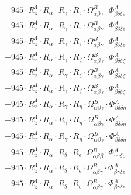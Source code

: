 \documentclass{article}
\begin{document}
\begin{subequations}
\begin{gather}
\begin{array}{c}
 \\[0.2em] 		 - 945 \cdot R_{z}^{4} \cdot R_{\alpha{}} \cdot R_{\gamma{}} \cdot R_{\epsilon{}} \cdot \Omega{}^{B}_{\alpha{}\beta{}\gamma{}} \cdot \Phi{}^{A}_{\beta{}\delta{}\delta{}\epsilon{}} 
 \\[0.2em] 		 - 945 \cdot R_{z}^{4} \cdot R_{\alpha{}} \cdot R_{\gamma{}} \cdot R_{\epsilon{}} \cdot \Omega{}^{B}_{\alpha{}\beta{}\gamma{}} \cdot \Phi{}^{A}_{\beta{}\delta{}\delta{}\epsilon{}} 
 \\[0.2em] 		 - 945 \cdot R_{z}^{4} \cdot R_{\alpha{}} \cdot R_{\gamma{}} \cdot R_{\epsilon{}} \cdot \Omega{}^{B}_{\alpha{}\beta{}\gamma{}} \cdot \Phi{}^{A}_{\beta{}\delta{}\delta{}\epsilon{}} 
 \\[0.2em] 		 - 945 \cdot R_{z}^{4} \cdot R_{\alpha{}} \cdot R_{\gamma{}} \cdot R_{\zeta{}} \cdot \Omega{}^{B}_{\alpha{}\beta{}\gamma{}} \cdot \Phi{}^{A}_{\beta{}\delta{}\delta{}\zeta{}} 
 \\[0.2em] 		 - 945 \cdot R_{z}^{4} \cdot R_{\alpha{}} \cdot R_{\gamma{}} \cdot R_{\zeta{}} \cdot \Omega{}^{B}_{\alpha{}\beta{}\gamma{}} \cdot \Phi{}^{A}_{\beta{}\delta{}\delta{}\zeta{}} 
 \\[0.2em] 		 - 945 \cdot R_{z}^{4} \cdot R_{\alpha{}} \cdot R_{\gamma{}} \cdot R_{\zeta{}} \cdot \Omega{}^{B}_{\alpha{}\beta{}\gamma{}} \cdot \Phi{}^{A}_{\beta{}\delta{}\delta{}\zeta{}} 
 \\[0.2em] 		 - 945 \cdot R_{z}^{4} \cdot R_{\alpha{}} \cdot R_{\gamma{}} \cdot R_{\eta{}} \cdot \Omega{}^{B}_{\alpha{}\beta{}\gamma{}} \cdot \Phi{}^{A}_{\beta{}\delta{}\delta{}\eta{}} 
 \\[0.2em] 		 - 945 \cdot R_{z}^{4} \cdot R_{\alpha{}} \cdot R_{\gamma{}} \cdot R_{\eta{}} \cdot \Omega{}^{B}_{\alpha{}\beta{}\gamma{}} \cdot \Phi{}^{A}_{\beta{}\delta{}\delta{}\eta{}} 
 \\[0.2em] 		 - 945 \cdot R_{z}^{4} \cdot R_{\alpha{}} \cdot R_{\gamma{}} \cdot R_{\eta{}} \cdot \Omega{}^{B}_{\alpha{}\beta{}\gamma{}} \cdot \Phi{}^{A}_{\beta{}\delta{}\delta{}\eta{}} 
 \\[0.2em] 		 - 945 \cdot R_{z}^{4} \cdot R_{\alpha{}} \cdot R_{\delta{}} \cdot R_{\epsilon{}} \cdot \Omega{}^{B}_{\alpha{}\beta{}\beta{}} \cdot \Phi{}^{A}_{\gamma{}\gamma{}\delta{}\epsilon{}} 
 \\[0.2em] 		 - 945 \cdot R_{z}^{4} \cdot R_{\alpha{}} \cdot R_{\delta{}} \cdot R_{\epsilon{}} \cdot \Omega{}^{B}_{\alpha{}\beta{}\gamma{}} \cdot \Phi{}^{A}_{\beta{}\gamma{}\delta{}\epsilon{}} 
 \\[0.2em] 		 - 945 \cdot R_{z}^{4} \cdot R_{\alpha{}} \cdot R_{\delta{}} \cdot R_{\epsilon{}} \cdot \Omega{}^{B}_{\alpha{}\beta{}\gamma{}} \cdot \Phi{}^{A}_{\beta{}\gamma{}\delta{}\epsilon{}} 

\end{array}
\end{gather}
\end{subequations}
\end{document}
